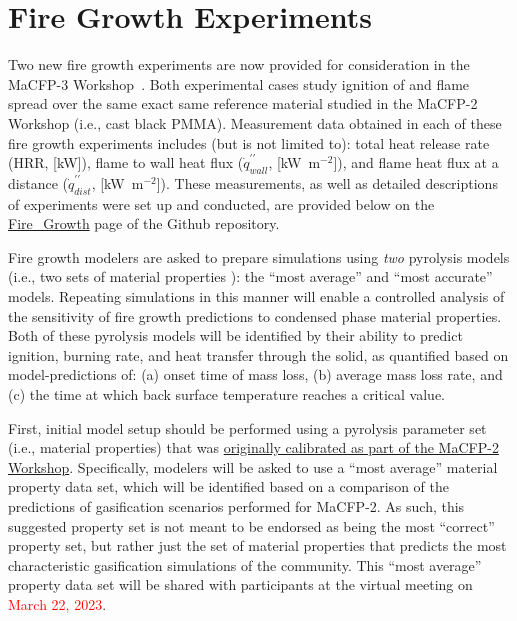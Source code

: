 \documentclass[12pt]{article}
\newcommand{\pp}{\prime\prime}
\begin{document}
\clearpage
\section{Fire Growth Experiments}
\label{Sec:Fire Growth}
Two new fire growth experiments are now provided for consideration in the MaCFP-3 Workshop~\cite{chaudhari2021experimental, Leventon2022ParallelPanel}. Both experimental cases study ignition of and flame spread over the same exact same reference material studied in the MaCFP-2 Workshop (i.e., cast black PMMA). Measurement data obtained in each of these fire growth experiments includes (but is not limited to): total heat release rate (HRR, [kW]), flame to wall heat flux ($\dot{q}^{\pp}_{wall}$, [kW~m$^{-2}$]), and flame heat flux at a distance ($\dot{q}^{\pp}_{dist}$, [kW~m$^{-2}$]). These measurements, as well as detailed descriptions of experiments were set up and conducted, are provided below on the \href{https://github.com/MaCFP/macfp-db/tree/master/Fire_Growth}{Fire\_Growth} page of the Github repository.

Fire growth modelers are asked to prepare simulations using \emph{two} pyrolysis models (i.e., two sets of material properties ): the ``most average'' and ``most accurate'' models. Repeating simulations in this manner will enable a controlled analysis of the sensitivity of fire growth predictions to condensed phase material properties. Both of these pyrolysis models will be identified by their ability to predict ignition, burning rate, and heat transfer through the solid, as quantified based on model-predictions of: (a) onset time of mass loss, (b) average mass loss rate, and (c) the time at which back surface temperature reaches a critical value.

First, initial model setup should be performed using a pyrolysis parameter set (i.e., material properties) that was \href{https://github.com/MaCFP/matl-db/tree/master/PMMA/Material_Properties}{originally calibrated as part of the MaCFP-2 Workshop}. Specifically, modelers will be asked to use a ``most average'' material property data set, which will be identified based on a comparison of the predictions of gasification scenarios performed for MaCFP-2. As such, this suggested property set is not meant to be endorsed as being the most ``correct'' property set, but rather just the set of material properties that predicts the most characteristic gasification simulations of the community. This ``most average'' property data set will be shared with participants at the virtual meeting on \textcolor{red}{March 22, 2023}.
\end{document}
